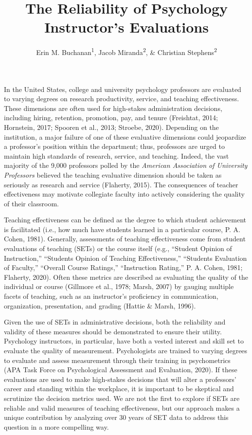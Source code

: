 \documentclass[
  man]{apa7}
\title{The Reliability of Psychology Instructor's Evaluations}
\author{Erin M. Buchanan\textsuperscript{1}, Jacob Miranda\textsuperscript{2}, \& Christian Stephens\textsuperscript{2}}
\date{}
\affiliation{\vspace{0.5cm}\textsuperscript{1} Harrisburg University of Science and Technology\\\textsuperscript{2} University of Alabama}
\begin{document}
\maketitle

In the United States, college and university psychology professors are
evaluated to varying degrees on research productivity, service, and
teaching effectiveness. These dimensions are often used for high-stakes
administration decisions, including hiring, retention, promotion, pay,
and tenure (Freishtat, 2014; Hornstein, 2017; Spooren et al., 2013; Stroebe, 2020).
Depending on the institution, a major failure of one of these evaluative
dimensions could jeopardize a professor's position within the
department; thus, professors are urged to maintain high standards of
research, service, and teaching. Indeed, the vast majority of the 9,000
professors polled by the \emph{American Association of University Professors}
believed the teaching evaluative dimension should be taken as seriously
as research and service (Flaherty, 2015). The consequences of teacher
effectiveness may motivate collegiate faculty into actively considering
the quality of their classroom.

Teaching effectiveness can be defined as the degree to which student
achievement is facilitated (i.e., how much have students learned in a
particular course, P. A. Cohen, 1981). Generally, assessments of teaching
effectiveness come from student evaluations of teaching (SETs) or the
course itself (e.g., ``Student Opinion of Instruction,'' ``Students Opinion
of Teaching Effectiveness,'' ``Students Evaluation of Faculty,'' ``Overall
Course Ratings,'' ``Instruction Rating,'' P. A. Cohen, 1981; Flaherty, 2020). Often
these metrics are described as evaluating the quality of the individual
or course (Gillmore et al., 1978; Marsh, 2007) by gauging multiple facets of teaching, such as an instructor's proficiency in communication, organization, presentation, and grading (Hattie \& Marsh, 1996).

Given the use of SETs in administrative decisions, both the reliability and validity of these measures should be demonstrated to ensure their utility. Psychology instructors, in particular, have both a vested interest and skill set to evaluate the quality of measurement. Psychologists are trained to varying degrees to evaluate and assess measurement through their training in psychometrics (APA Task Force on Psychological Assessment and Evaluation, 2020). If these evaluations are used to make high-stakes decisions that will alter a professors' career and standing within the workplace, it is important to be skeptical and scrutinize the decision metrics used. We are not the first to explore if SETs are reliable and valid measures of teaching effectiveness, but our approach makes a unique contribution by analyzing over 30 years of SET data to address this question in a more compelling way.
\end{document}

